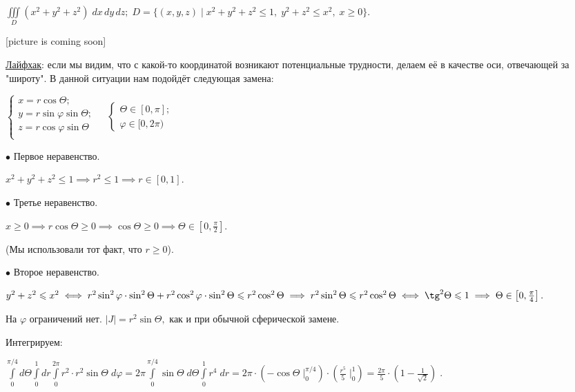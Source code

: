 \documentclass[a4paper, fleqn]{article}
\begin{document}
    $\displaystyle \iiint\limits_{D} (x^2 + y^2 + z^2) \; dx \, dy\, dz; \; D = \{(x,y,z) \mid x^2 + y^2 + z^2 \leq 1, \; y^2 + z^2 \leq x^2, \; x \geq 0 \}. $
    
    [picture is coming soon]
    
    \underline{Лайфхак}: если мы видим, что с какой-то координатой возникают потенциальные трудности, делаем её в качестве оси, отвечающей за "широту". В данной ситуации нам подойдёт следующая замена:
    
    $\begin{cases}
    x = r \cos \Theta;\\
    y = r \sin  \varphi \sin  \Theta;\\
    z = r \cos  \varphi \sin  \Theta \\
    \end{cases} \; \; \; \; 
    \begin{cases}
    \Theta \in [0,\pi];\\
    \varphi \in [0, 2 \pi)
    \end{cases}$
    
    $\bullet$ Первое неравенство.
    
    $x^2 + y^2 + z^2 \leq 1 \implies r^2 \leq 1 \implies r \in [0,1].$
    
    $\bullet$ Третье неравенство.
    
    $x \geq 0 \implies r \cos \Theta \geq 0 \implies \cos \Theta \geq 0 \implies \Theta \in \left[0, \frac{\pi}{2}\right]. $
    
    (Мы использовали тот факт, что $r \geq 0$).
    
    $\bullet$ Второе неравенство.
    
    $y^2 + z^2 \leq x^2 \iff
    r^2 \sin^2  \varphi \cdot \sin^2  \Theta +
    r^2 \cos^2  \varphi \cdot  \sin^2  \Theta \leq 
    r^2 \cos^2 \Theta \implies r^2 \sin^2 \Theta \leq r^2 \cos^2 \Theta \iff \tg^2 \Theta \leq 1 \implies \Theta \in \left[ 0, \frac{\pi}{4} \right].$
    
    На $\varphi$ ограничений нет. $|J| = r^2 \sin \Theta,$ как и при обычной сферической замене.
    
    Интегрируем:
    
    $\displaystyle \int \limits_{0}^{\pi /4} d\Theta  \int \limits_{0}^{1} dr  \int \limits_{0}^{2 \pi}   r^2 \cdot r^2 \sin \Theta \; d \varphi  = 2 \pi \int \limits_{0}^{\pi /4} \sin \Theta \;  d\Theta  \int \limits_{0}^{1}  r^4   \; dr = 2 \pi \cdot  \left( -\cos \Theta \;  \Bigg|_{0}^{\pi /4} \right) \cdot \left( \frac{r^5}{5} \; \Bigg|_0^1 \right) = \boxed{\frac{2\pi}{5} \cdot \left(1 - \frac{1}{\sqrt{2}} \right)} \; .$
    
\end{document}
